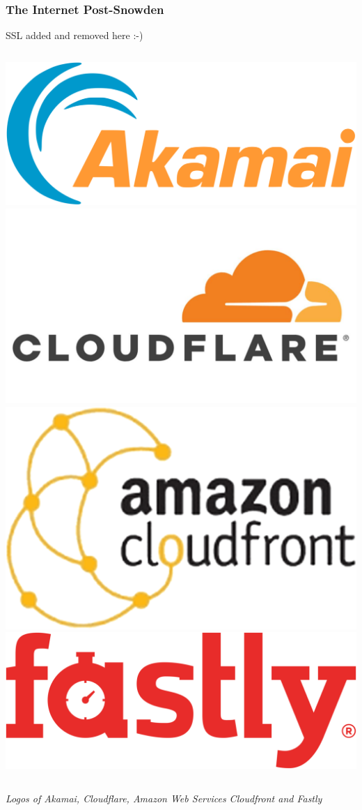 \documentclass[aspectratio=169,usenames,dvipsnames]{beamer}
\begin{document}
\begin{frame}
  \frametitle{The Internet Post-Snowden}

  SSL added and removed here :-)

  \vspace{5mm}

  \begin{columns}[c]
    \centering
    \includegraphics[width=.40\textwidth,height=.45\textheight,keepaspectratio]{img/logo_akamai.png}\\
    \includegraphics[width=.40\textwidth,height=.45\textheight,keepaspectratio]{img/logo_cloudflare.jpg}
    \centering
    \includegraphics[width=.40\textwidth,height=.45\textheight,keepaspectratio]{img/logo_cloudfront.png}\\
    \includegraphics[width=.40\textwidth,height=.45\textheight,keepaspectratio]{img/logo_fastly.png}\\
  \end{columns}

  \vspace{5mm}

  \centering

  \footnotesize
  \emph{Logos of Akamai, Cloudflare, Amazon Web Services Cloudfront and
  Fastly}
\end{frame}
\end{document}
